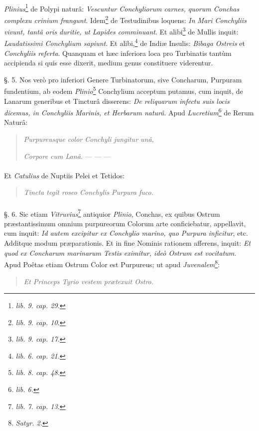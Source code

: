 \documentclass[a4paper, 11pt, oneside, polutonikogreek, german]{article}
\begin{document}
\paragraph{}
\emph{Plinius}\footnote{\emph{lib. 9. cap. 29.}} de Polypi naturâ: \emph{Vescuntur Conchyliorum carnes, quorum Conchas complexu crinium frangunt}. Idem\footnote{\emph{lib. 9. cap. 10.}} de Testudinibus loquens: \emph{In Mari Conchyliis vivunt, tantâ oris duritie, ut Lapides comminuant}. Et alibi\footnote{\emph{lib. 9. cap. 17.}} de Mullis inquit: \emph{Laudatissimi Conchylium sapiunt}. Et alibi,\footnote{\emph{lib. 6. cap. 21.}} de Indiæ Insulis: \emph{Bibaga Ostreis} et \emph{Conchyliis referta}. Quanquam et hæc inferiora loca pro Turbinatis tantùm accipienda si quis esse dixerit, medium genus constituere viderentur.

§. 5. Nos verò pro inferiori Genere Turbinatorum, sive Concharum, Purpuram fundentium, ab eodem \emph{Plinio}\footnote{\emph{lib. 8. cap. 48.}} Conchylium acceptum putamus, cum inquit, de Lanarum generibus et Tincturâ disserens: \emph{De reliquarum infectu suis locis dicemus, in Conchyliis Marinis, et Herbarum naturâ}. Apud \emph{Lucretium}\footnote{\emph{lib. 6.}} de Rerum Naturâ:
\begin{quotation}
\emph{Purpureusque color Conchyli jungitur unâ,}

\emph{Corpore cum Lanâ.} --- --- ---
\end{quotation}
\paragraph{}
Et \emph{Catulius} de Nuptiis Pelei et Tetidos:
\begin{quotation}
\emph{Tincta tegit roseo Conchylis Purpura fuco.}
\end{quotation}
\paragraph{}
§. 6. Sic etiam \emph{Vitruvius}\footnote{\emph{lib. 7. cap. 13.}} antiquior \emph{Plinio}, Conchas, ex quibus Ostrum præstantissimum omnium purpureorum Colorum arte conficiebatur, appellavit, cum inquit: \emph{Id autem excipitur ex Conchylio marino, quo Purpura inficitur}, etc. Additque modum præparationis. Et in fine Nominis rationem afferens, inquit: \emph{Et quod ex Concharum marinarum Testis eximitur, ideò Ostrum est vocitatum}. Apud Poêtas etiam Ostrum Color est Purpureus; ut apud \emph{Juvenalem}\footnote{\emph{Satyr. 2.}}:
\begin{quotation}
\emph{Et Princeps Tyrio vestem prætexuit Ostro.}
\end{quotation}
\end{document}
